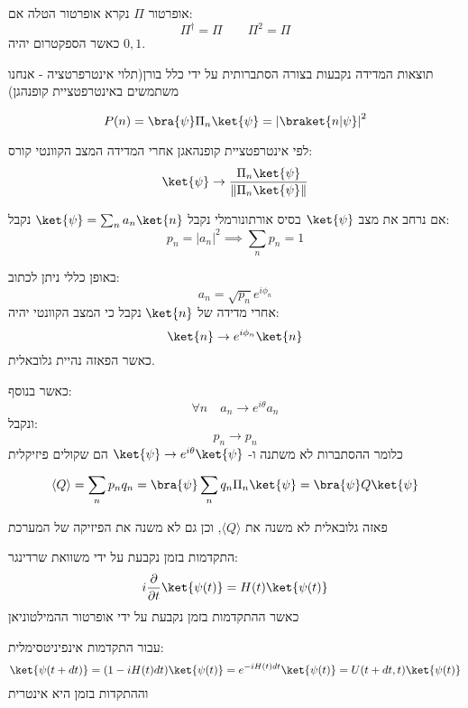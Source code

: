 \documentclass{tstextbook}
\begin{document}
\begin{definition}
אופרטור \(\Pi\) נקרא אופרטור הטלה אם:
$$\Pi ^{\dagger} = \Pi \qquad \Pi^{2}=\Pi$$
כאשר הספקטרום יהיה \(0,1\).

\end{definition}
\begin{definition}
תוצאות המדידה נקבעות בצורה הסתברותית על ידי כלל בורן(תלוי אינטרפרטציה - אנחנו משתמשים באינטרפטציית קופנהגן)

\end{definition}
\begin{proposition}
$$P(n)= \bra{\psi} \Pi_{n}\ket{\psi} =\left\lvert  \braket{ n | \psi }   \right\rvert ^{2}$$

\end{proposition}
לפי אינטרפטציית קופנהאגן אחרי המדידה המצב הקוונטי קורס:
$$\ket{\psi} \to \frac{\Pi_{n}\ket{\psi}}{\left\lVert  \Pi_{n}\ket{\psi}   \right\rVert } $$

\begin{corollary}
אם נרחב את מצב \(\ket{\psi}\) בסיס אורתונורמלי נקבל \(\ket{\psi}=\sum_{n} a_{n}\ket{n}\) נקבל:
$$p_{n}= \lvert a_{n} \rvert ^{2}\implies \sum_{n}p_{n}=1$$

\end{corollary}
באופן כללי ניתן לכתוב:
$$a_{n}=\sqrt{ p_{n} }e^{ i\phi_{n} }$$
אחרי מדידה של \(\ket{n}\) נקבל כי המצב הקוונטי יהיה:
$$\ket{n} \to e^{ i\phi_{n} }\ket{n} $$
כאשר הפאזה נהיית גלובאלית.

כאשר בנוסף:
$$\forall n\quad a_{n}\to e^{ i\theta }a_{n}$$
ונקבל:
$$p_{n}\to p_{n}$$
כלומר ההסתברות לא משתנה ו- \(\ket{\psi}\to e^{ i\theta }\ket{\psi}\) הם שקולים פיזיקלית

\begin{definition}
$$\left\langle  Q  \right\rangle=\sum_{n} p_{n}q_{n} = \bra{\psi} \sum_{n}q_{n} \Pi_{n} \ket{\psi} = \bra{\psi} Q \ket{\psi}  $$

\end{definition}
\begin{corollary}
פאזה גלובאלית לא משנה את \(\langle Q \rangle\), וכן גם לא משנה את הפיזיקה של המערכת

\end{corollary}
\begin{definition}
התקדמות בזמן נקבעת על ידי משוואת שרדינגר:
$$i\frac{\partial }{\partial t} \ket{\psi(t)} =H(t)\ket{\psi(t)} $$
כאשר ההתקדמות בזמן נקבעת על ידי אופרטור ההמילטוניאן

\end{definition}
עבור התקדמות אינפיניטסימלית:
$$\ket{\psi(t+dt)} =(1-iH(t)dt)\ket{\psi(t)} = e^{ -iH(t)dt }\ket{\psi(t)}=U(t+dt,t)\ket{\psi(t)}  $$
וההתקדות בזמן היא אינטרית
\end{document}
